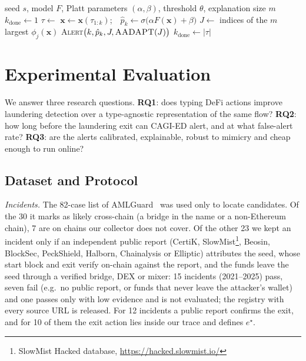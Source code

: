 \documentclass[runningheads]{llncs}
\newcommand{\1}{\mathbb{1}}
\begin{document}
\begin{algorithm}[t]
\caption{Online early-warning monitor}
\label{alg:monitor}
\begin{algorithmic}[1]
\Require seed $s$, model $F$, Platt parameters $(\alpha,\beta)$, threshold $\theta$, explanation size $m$
\State $k_{\mathrm{done}}\gets1$
  \State $\tau\gets$  
    \State $\mathbf{x}\gets\mathbf{x}(\tau_{1:k})$;\ \ $\hat p_k\gets\sigma\bigl(\alpha F(\mathbf{x})+\beta\bigr)$ 
      \State $J\gets$ indices of the $m$ largest $\phi_j(\mathbf{x})$ 
      \State \Return \textsc{Alert}$\bigl(k,\hat p_k,J,\textsc{AADAPT}(J)\bigr)$ 
    \EndIf
  \EndFor
  \State $k_{\mathrm{done}}\gets|\tau|$
\EndFor
\end{algorithmic}
\end{algorithm}

\section{Experimental Evaluation}
\label{sec:experiments}

We answer three research questions.
\textbf{RQ1}: does typing DeFi actions improve laundering detection over a type-agnostic representation of the same flow?
\textbf{RQ2}: how long before the laundering exit can CAGI-ED alert, and at what false-alert rate?
\textbf{RQ3}: are the alerts calibrated, explainable, robust to mimicry and cheap enough to run online?

\subsection{Dataset and Protocol}
\label{sec:setup}

\emph{Incidents.} The 82-case list of AMLGuard~\cite{wu2026amlguard} was used only to locate candidates.
Of the 30 it marks as likely cross-chain (a bridge in the name or a non-Ethereum chain), 7 are on chains our collector does not cover.
Of the other 23 we kept an incident only if an independent public report (CertiK, SlowMist\footnote{SlowMist Hacked database, \url{https://hacked.slowmist.io/}}, Beosin, BlockSec, PeckShield, Halborn, Chainalysis or Elliptic) attributes the seed, whose start block and exit verify on-chain against the report, and the funds leave the seed through a verified bridge, DEX or mixer: 15 incidents (2021--2025) pass, seven fail (e.g.\ no public report, or funds that never leave the attacker's wallet) and one passes only with low evidence and is not evaluated; the registry with every source URL is released.
For 12 incidents a public report confirms the exit, and for 10 of them the exit action lies inside our trace and defines $e^\star$.
\end{document}
